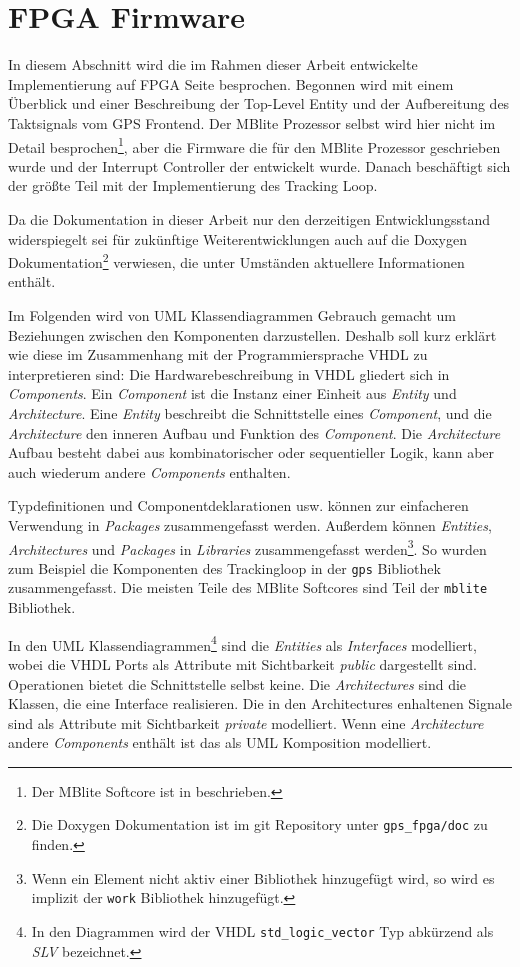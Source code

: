\section{FPGA Firmware}
In diesem Abschnitt wird die im Rahmen dieser Arbeit entwickelte Implementierung auf FPGA Seite besprochen. Begonnen wird mit einem Überblick und einer Beschreibung der Top-Level Entity und der Aufbereitung des Taktsignals vom GPS Frontend. Der MBlite Prozessor selbst wird hier nicht im Detail besprochen\footnote{Der MBlite Softcore ist in \cite{MBliteThesis} beschrieben.}, aber die Firmware die für den MBlite Prozessor geschrieben wurde und der Interrupt Controller der entwickelt wurde. Danach beschäftigt sich der größte Teil mit der Implementierung des Tracking Loop.

Da die Dokumentation in dieser Arbeit nur den derzeitigen Entwicklungsstand widerspiegelt sei für zukünftige Weiterentwicklungen auch auf die Doxygen Dokumentation\footnote{Die Doxygen Dokumentation ist im git Repository unter \lstinline$gps_fpga/doc$ zu finden.} verwiesen, die unter Umständen aktuellere Informationen enthält. 

Im Folgenden wird von UML Klassendiagrammen Gebrauch gemacht um Beziehungen zwischen den Komponenten darzustellen. Deshalb soll kurz erklärt wie diese im Zusammenhang mit der Programmiersprache VHDL zu interpretieren sind: Die Hardwarebeschreibung in VHDL gliedert sich in \emph{Components}. Ein \emph{Component} ist die Instanz einer Einheit aus \emph{Entity} und  \emph{Architecture}. Eine \emph{Entity} beschreibt die Schnittstelle eines \emph{Component}, und die \emph{Architecture} den inneren Aufbau und Funktion des \emph{Component}. Die \emph{Architecture} Aufbau besteht dabei aus kombinatorischer oder sequentieller Logik, kann aber auch wiederum andere \emph{Components} enthalten.

Typdefinitionen und Componentdeklarationen usw. können zur einfacheren Verwendung in \emph{Packages} zusammengefasst werden. Außerdem können \emph{Entities}, \emph{Architectures} und \emph{Packages} in \emph{Libraries} zusammengefasst werden\footnote{Wenn ein Element nicht aktiv einer Bibliothek hinzugefügt wird, so wird es implizit der \lstinline$work$ Bibliothek hinzugefügt.}. So wurden zum Beispiel die Komponenten des Trackingloop in der \lstinline$gps$ Bibliothek zusammengefasst. Die meisten Teile des MBlite Softcores sind Teil der \lstinline$mblite$ Bibliothek.

In den UML Klassendiagrammen\footnote{In den Diagrammen wird der VHDL \lstinline$std_logic_vector$ Typ abkürzend als \emph{SLV} bezeichnet.} sind die \emph{Entities} als  \emph{Interfaces} modelliert, wobei die VHDL Ports als Attribute mit Sichtbarkeit \emph{public} dargestellt sind. Operationen bietet die Schnittstelle selbst keine. Die \emph{Architectures} sind die Klassen, die eine Interface realisieren. Die in den Architectures enhaltenen Signale sind als Attribute mit Sichtbarkeit \emph{private} modelliert. Wenn eine \emph{Architecture} andere \emph{Components} enthält ist das als UML Komposition modelliert.

